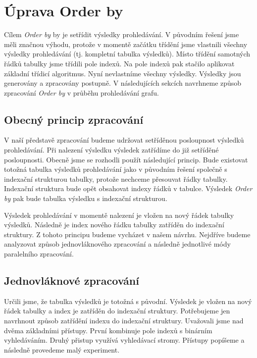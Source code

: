 \section{Úprava Order by} \label{anal.improvement.orderby}

Cílem \textit{Order by} by je setřídit výsledky prohledávání.
V původním řešení jsme měli značnou výhodu, protože v momentě začátku třídění jsme vlastnili všechny výsledky prohledávání (tj. kompletní tabulka výsledků).
Místo třídění samotných řádků tabulky jsme třídili pole indexů.
Na pole indexů pak stačilo aplikovat základní třídicí algoritmus.
Nyní nevlastníme všechny výsledky.
Výsledky jsou generovány a zpracovány postupně.
V následujících sekcích navrhneme způsob zpracování \textit{Order by} v průběhu prohledávání grafu.

\subsection{Obecný princip zpracování}

V naší představě zpracování budeme udržovat setříděnou posloupnost výsledků prohledávání.
Při nalezení výsledku výsledek zatřídíme do již setříděné posloupnosti.
Obecně jsme se rozhodli použít následující princip.
Bude existovat totožná tabulka výsledků prohledávání jako v původním řešení společně s indexační strukturou tabulky, protože nechceme přesouvat řádky tabulky.
Indexační struktura bude opět obsahovat indexy řádků v tabulce.
Výsledek \textit{Order by} pak bude tabulka výsledku s indexační strukturou.

Výsledek prohledávání v momentě nalezení je vložen na nový řádek tabulky výsledků.
Následně je index nového řádku tabulky zatříděn do indexační struktury.
Z tohoto principu budeme vycházet v našem návrhu.
Nejdříve budeme analyzovat způsob jednovláknového zpracování a následně jednotlivé módy paralelního zpracování.

\subsection{Jednovláknové zpracování} \label{anal.ordeby.single}

Určili jsme, že tabulka výsledků je totožná s původní.
Výsledek je vložen na nový řádek tabulky a index je zatříděn do indexační struktury.
Potřebujeme jen navrhnout způsob zatřídění indexu do indexační struktury.
Uvažovali jsme nad dvěma základními přístupy.
První kombinuje pole indexů s binárním vyhledáváním.
Druhý přistup využívá vyhledávací stromy.
Přístupy popíšeme a následně provedeme malý experiment.

